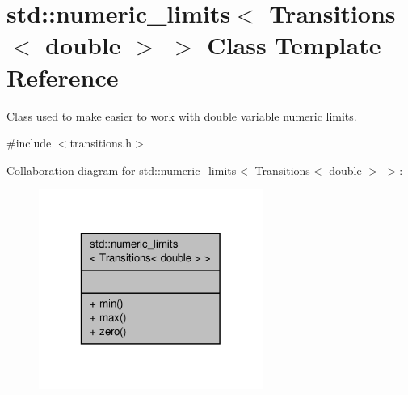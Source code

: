 \hypertarget{classstd_1_1numeric__limits_3_01Transitions_3_01double_01_4_01_4}{\section{std\-:\-:numeric\-\_\-limits$<$ Transitions$<$ double $>$ $>$ Class Template Reference}
\label{classstd_1_1numeric__limits_3_01Transitions_3_01double_01_4_01_4}
}


Class used to make easier to work with double variable numeric limits.  




{\ttfamily \#include $<$transitions.\-h$>$}



Collaboration diagram for std\-:\-:numeric\-\_\-limits$<$ Transitions$<$ double $>$ $>$\-:\nopagebreak
\begin{figure}[H]
\begin{center}
\leavevmode
\includegraphics[width=208pt]{classstd_1_1numeric__limits_3_01Transitions_3_01double_01_4_01_4__coll__graph}
\end{center}
\end{figure}
